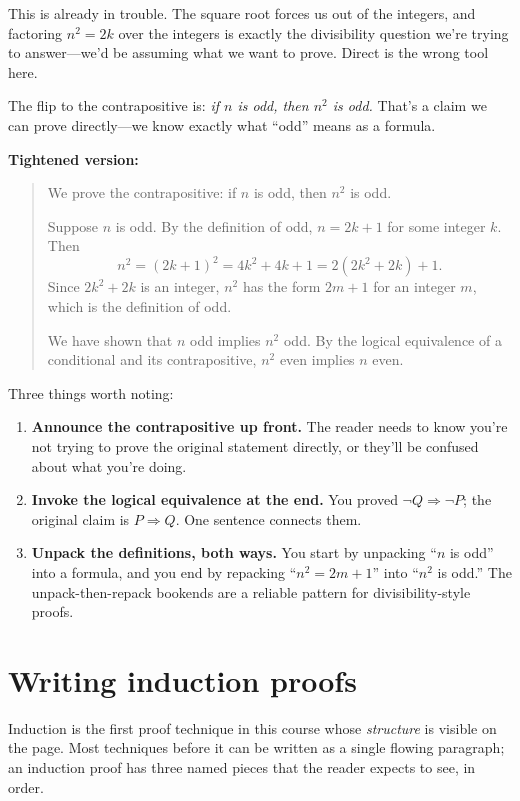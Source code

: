 \documentclass[11pt]{article}
\begin{document}
This is already in trouble. The square root forces us out of the integers, and factoring $n^2 = 2k$ over the integers is exactly the divisibility question we're trying to answer---we'd be assuming what we want to prove. Direct is the wrong tool here.

The flip to the contrapositive is: \emph{if $n$ is odd, then $n^2$ is odd.} That's a claim we can prove directly---we know exactly what ``odd'' means as a formula.

\medskip
\noindent\textbf{Tightened version:}
\begin{quote}
We prove the contrapositive: if $n$ is odd, then $n^2$ is odd.

\smallskip
Suppose $n$ is odd. By the definition of odd, $n = 2k + 1$ for some integer $k$. Then
\[
  n^2 = (2k+1)^2 = 4k^2 + 4k + 1 = 2(2k^2 + 2k) + 1.
\]
Since $2k^2 + 2k$ is an integer, $n^2$ has the form $2m + 1$ for an integer $m$, which is the definition of odd.

\smallskip
We have shown that $n$ odd implies $n^2$ odd. By the logical equivalence of a conditional and its contrapositive, $n^2$ even implies $n$ even.
\end{quote}

Three things worth noting:

\begin{enumerate}
  \item \textbf{Announce the contrapositive up front.} The reader needs to know you're not trying to prove the original statement directly, or they'll be confused about what you're doing.
  \item \textbf{Invoke the logical equivalence at the end.} You proved $\lnot Q \Rightarrow \lnot P$; the original claim is $P \Rightarrow Q$. One sentence connects them.
  \item \textbf{Unpack the definitions, both ways.} You start by unpacking ``$n$ is odd'' into a formula, and you end by repacking ``$n^2 = 2m + 1$'' into ``$n^2$ is odd.'' The unpack-then-repack bookends are a reliable pattern for divisibility-style proofs.
\end{enumerate}

\section{Writing induction proofs}

Induction is the first proof technique in this course whose \emph{structure} is visible on the page. Most techniques before it can be written as a single flowing paragraph; an induction proof has three named pieces that the reader expects to see, in order.
\end{document}
